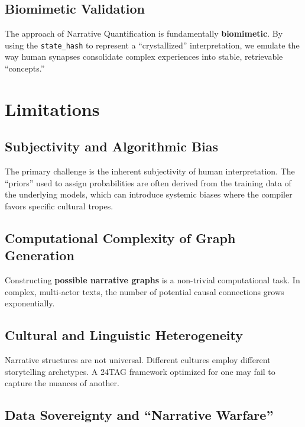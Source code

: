 \documentclass[11pt,a4paper]{article}
\begin{document}
\subsection{Biomimetic Validation}

The approach of Narrative Quantification is fundamentally
\textbf{biomimetic}. By using the \texttt{state\_hash} to represent a
``crystallized'' interpretation, we emulate the way human synapses
consolidate complex experiences into stable, retrievable ``concepts.''

\section{Limitations}

\subsection{Subjectivity and Algorithmic Bias}

The primary challenge is the inherent subjectivity of human
interpretation. The ``priors'' used to assign probabilities are often
derived from the training data of the underlying models, which can
introduce systemic biases where the compiler favors specific cultural
tropes.

\subsection{Computational Complexity of Graph Generation}

Constructing \textbf{possible narrative graphs} is a non-trivial
computational task. In complex, multi-actor texts, the number of
potential causal connections grows exponentially.

\subsection{Cultural and Linguistic Heterogeneity}

Narrative structures are not universal. Different cultures employ
different storytelling archetypes. A 24TAG framework optimized for one
may fail to capture the nuances of another.

\subsection{Data Sovereignty and ``Narrative Warfare''}
\end{document}
